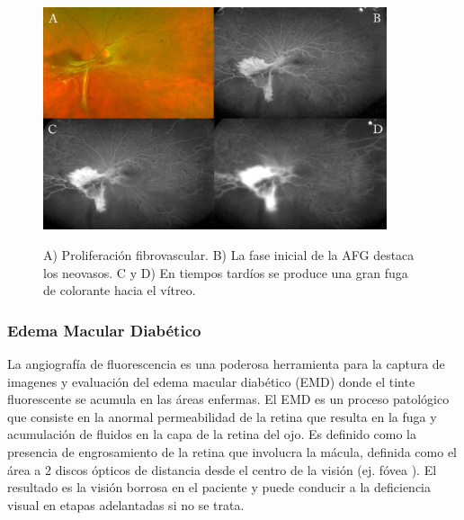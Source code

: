 \begin{figure}[H]
\centering
\includegraphics[width=0.9\textwidth]{./Figures/AF_HIPERNEOVASOS.png}
\label{fig:lightfilter}
\caption{A) Proliferación fibrovascular. B) La fase inicial de la AFG destaca los neovasos. C y D) En tiempos tardíos se produce una gran fuga de colorante hacia el vítreo.}
\end{figure}




\subsubsection{Edema Macular Diabético}

La angiografía de fluorescencia es una poderosa herramienta para la captura de imagenes y evaluación del edema macular diabético (EMD) donde el tinte fluorescente se acumula en las áreas enfermas.
El EMD es un proceso patológico que consiste en la anormal permeabilidad de la retina que resulta en la fuga y acumulación de fluidos en la capa de la retina del ojo. Es definido como la presencia de engrosamiento de la retina que involucra la mácula, definida como el área a 2 discos ópticos de distancia desde el centro de la visión (ej. fóvea ). El resultado es la visión borrosa en el paciente y puede conducir a la deficiencia visual en etapas adelantadas si no se trata. \cite{el2011segmentation}


